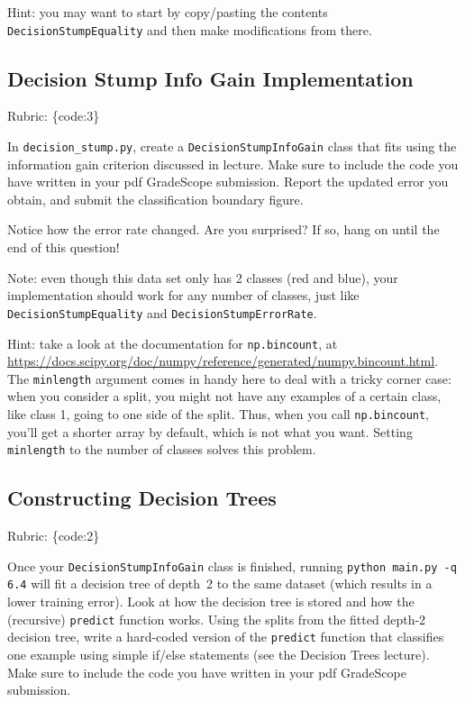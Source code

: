\documentclass{article}
\def\rubric#1{\gre{Rubric: \{#1\}}}{}
\def\blu#1{{\color{blu}#1}}
\def\gre#1{{\color{gre}#1}}
\begin{document}
Hint: you may want to start by copy/pasting the contents \texttt{DecisionStumpEquality} and then make modifications from there. 


\subsection{Decision Stump Info Gain Implementation}
\rubric{code:3}

In \texttt{decision\string_stump.py}, \blu{create a \texttt{DecisionStumpInfoGain} class that 
fits using the information gain criterion discussed in lecture. Make sure to include the code you have written in your pdf GradeScope submission. Report the updated error you obtain, and submit the classification boundary figure.}

Notice how the error rate changed. Are you surprised? If so, hang on until the end of this question!

Note: even though this data set only has 2 classes (red and blue), your implementation should work 
for any number of classes, just like \texttt{DecisionStumpEquality} and \texttt{DecisionStumpErrorRate}.

Hint: take a look at the documentation for \texttt{np.bincount}, at \\
\url{https://docs.scipy.org/doc/numpy/reference/generated/numpy.bincount.html}. 
The \texttt{minlength} argument comes in handy here to deal with a tricky corner case:
when you consider a split, you might not have any examples of a certain class, like class 1,
going to one side of the split. Thus, when you call \texttt{np.bincount}, you'll get
a shorter array by default, which is not what you want. Setting \texttt{minlength} to the 
number of classes solves this problem.

\subsection{Constructing Decision Trees}
\rubric{code:2}

Once your \texttt{DecisionStumpInfoGain} class is finished, running \texttt{python main.py -q 6.4} will fit
a decision tree of depth~2 to the same dataset (which results in a lower training error).
Look at how the decision tree is stored and how the (recursive) \texttt{predict} function works.
\blu{Using the splits from the fitted depth-2 decision tree, write a hard-coded version of the \texttt{predict}
function that classifies one example using simple if/else statements
(see the Decision Trees lecture).} Make sure to include the code you have written in your pdf GradeScope submission.
\end{document}

